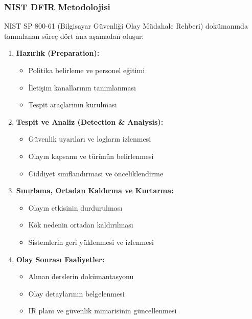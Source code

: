 \subsubsection{NIST DFIR Metodolojisi}

NIST SP 800-61 (Bilgisayar Güvenliği Olay Müdahale Rehberi) dokümanında tanımlanan süreç dört ana aşamadan oluşur:

\begin{enumerate}
    \item \textbf{Hazırlık (Preparation):}
    \begin{itemize}
        \item Politika belirleme ve personel eğitimi
        \item İletişim kanallarının tanımlanması
        \item Tespit araçlarının kurulması
    \end{itemize}

    \item \textbf{Tespit ve Analiz (Detection \& Analysis):}
    \begin{itemize}
        \item Güvenlik uyarıları ve logların izlenmesi
        \item Olayın kapsamı ve türünün belirlenmesi
        \item Ciddiyet sınıflandırması ve önceliklendirme
    \end{itemize}

    \item \textbf{Sınırlama, Ortadan Kaldırma ve Kurtarma:}
    \begin{itemize}
        \item Olayın etkisinin durdurulması
        \item Kök nedenin ortadan kaldırılması
        \item Sistemlerin geri yüklenmesi ve izlenmesi
    \end{itemize}

    \item \textbf{Olay Sonrası Faaliyetler:}
    \begin{itemize}
        \item Alınan derslerin dokümantasyonu
        \item Olay detaylarının belgelenmesi
        \item IR planı ve güvenlik mimarisinin güncellenmesi
    \end{itemize}
\end{enumerate}

